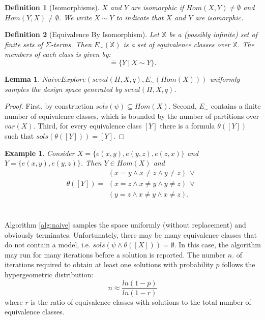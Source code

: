 \documentclass[conference]{IEEEtran}
\newtheorem{defn}{Definition}
\newtheorem{lem}{Lemma}
\newtheorem{exmp}{Example}[section]
\newcommand{\Hom}[2]{\mathit{Hom}(#1,#2)}
\newcommand{\HImg}[1]{\mathit{Hom}(#1)}
\newcommand{\seval}[3]{\mathit{seval}(#1,#2,#3)}
\newcommand{\DefinedToBe}{\stackrel{\mathit{\cdot}}{=}}
\newcommand{\iso}{\sim}
\newcommand{\sols}[1]{\mathit{sols}(#1)}
\begin{document}
\begin{defn}[Isomorphisms] $X$ and $Y$ are isomorphic if $\Hom{X}{Y} \neq \emptyset$ and $\Hom{Y}{X} \neq \emptyset$. We write $X \iso Y$ to indicate that $X$ and $Y$ are isomorphic.
\end{defn}

\begin{defn}[Equivalence By Isomorphism] Let $\mathbb{X}$ be a (possibly infinite) set of finite sets of  $\Sigma$-terms. Then $E_{\iso}(\mathbb{X})$ is a set of equivalence classes over $\mathbb{X}$. The members of each class is given by:
\begin{equation}
[X] \DefinedToBe \{ Y \ | \ X \iso Y \}.
\end{equation} 
\end{defn}

\begin{lem} $NaiveExplore(\seval{\Pi}{X}{q},E_{\iso}(\HImg{X}))$ uniformly samples the design space generated by $\seval{\Pi}{X}{q}$.
\end{lem}
\begin{proof}
First, by construction $\sols{\psi} \subseteq \HImg{X}$. Second, $E_{\iso}$ contains a finite number of equivalence classes, which is bounded by the number of partitions over $var(X)$. Third, for every equivalence class $[Y]$ there is a formula $\theta([Y])$ such that $\sols{\theta([Y])} = [Y]$.
\end{proof}

\begin{exmp}Consider $X = \{ e(x,y), e(y,z), e(z,x) \}$ and $Y = \{ e(x,y), e(y,z) \}$. Then $Y \in \HImg{X}$ and 
\begin{equation}
\theta([Y]) = \begin{array}{l}
 (x = y \wedge x \neq z \wedge y \neq z) \ \vee \\  
				      (x = z \wedge x \neq y \wedge y \neq z) \ \vee \\
				      (y = z \wedge x \neq y \wedge x \neq z).
\end{array}				      
\end{equation}
\end{exmp}

\section{}

Algorithm \ref{alg:naive} samples the space uniformly (without replacement) and obviously terminates. Unfortunately, there may be many equivalence classes that do not contain a model, i.e. $sols(\psi \wedge \theta([X])) = \emptyset$. In this case, the algorithm may run for many iterations before a solution is reported. The number $n$. of iterations required to obtain at least one solutions with probability $p$ follows the hypergeometric distribution:
\begin{equation}
n \approx \frac{ln(1-p)}{ln(1-r)}
\end{equation}
where $r$ is the ratio of equivalence classes with solutions to the total number of equivalence classes.
\end{document}
